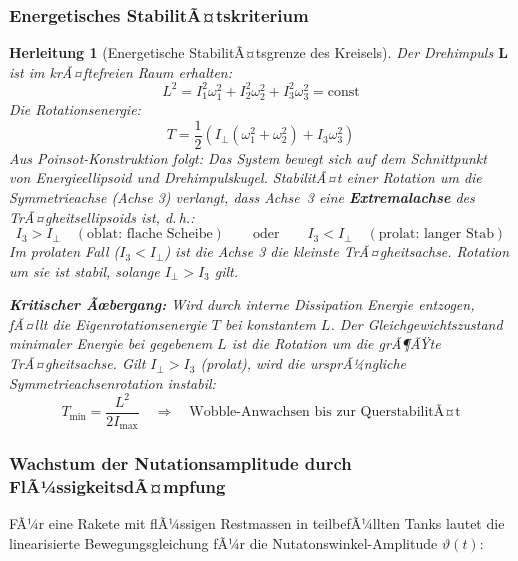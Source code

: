﻿\documentclass[12pt,a4paper]{article}
\newtheorem{herleitung}{Herleitung}[section]
\newcommand{\vek}[1]{\boldsymbol{#1}}
\begin{document}
\subsubsection{Energetisches StabilitÃ¤tskriterium}

\begin{herleitung}[Energetische StabilitÃ¤tsgrenze des Kreisels]
Der Drehimpuls $\vek{L}$ ist im krÃ¤ftefreien Raum erhalten:
\[
  L^2 = I_1^2\omega_1^2 + I_2^2\omega_2^2 + I_3^2\omega_3^2 = \mathrm{const}
\]
Die Rotationsenergie:
\[
  T = \frac{1}{2}\left(I_\perp(\omega_1^2+\omega_2^2) + I_3\omega_3^2\right)
\]
Aus Poinsot-Konstruktion folgt: Das System bewegt sich auf dem Schnittpunkt von
Energieellipsoid und Drehimpulskugel. StabilitÃ¤t einer Rotation um die
Symmetrieachse (Achse 3) verlangt, dass Achse~3 eine \textbf{Extremalachse}
des TrÃ¤gheitsellipsoids ist, d.\,h.:
\[
  I_3 > I_\perp \quad (\text{oblat: flache Scheibe})
  \qquad\text{oder}\qquad
  I_3 < I_\perp \quad (\text{prolat: langer Stab})
\]
Im prolaten Fall ($I_3 < I_\perp$) ist die Achse 3 die \emph{kleinste} TrÃ¤gheitsachse.
Rotation um sie ist stabil, solange $I_\perp > I_3$ gilt.

\textbf{Kritischer Ãœbergang:} Wird durch interne Dissipation Energie entzogen, fÃ¤llt
die Eigenrotationsenergie $T$ bei konstantem $L$. Der Gleichgewichtszustand minimaler
Energie bei gegebenem $L$ ist die Rotation um die \emph{grÃ¶ÃŸte} TrÃ¤gheitsachse. Gilt
$I_\perp > I_3$ (prolat), wird die ursprÃ¼ngliche Symmetrieachsenrotation instabil:
\[
  T_{\min} = \frac{L^2}{2I_{\max}} \quad\Rightarrow\quad
  \text{Wobble-Anwachsen bis zur QuerstabilitÃ¤t}
\]
\end{herleitung}

\subsubsection{Wachstum der Nutationsamplitude durch FlÃ¼ssigkeitsdÃ¤mpfung}

FÃ¼r eine Rakete mit flÃ¼ssigen Restmassen in teilbefÃ¼llten Tanks lautet die
linearisierte Bewegungsgleichung fÃ¼r die Nutatonswinkel-Amplitude $\vartheta(t)$:
\end{document}
